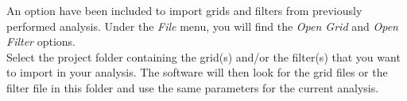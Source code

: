\newline
\indent\indent An option have been included to import grids and filters from previously performed analysis. Under the \textit{File} menu, you will find the \textit{Open Grid} and \textit{Open Filter} options.\\
\newline
\indent Select the project folder containing the grid(s) and/or the filter(s) that you want to import in your analysis. The software will then look for the grid files or the filter file in this folder and use the same parameters for the current analysis.
